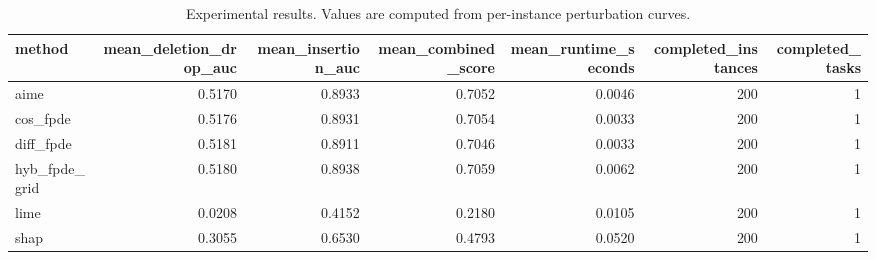 \begin{table}[t]
\caption{Experimental results. Values are computed from per-instance perturbation curves.}
\label{tab:main_results_computed}
\centering
\begin{tabular}{lrrrrrr}
\toprule
method & mean\_deletion\_drop\_auc & mean\_insertion\_auc & mean\_combined\_score & mean\_runtime\_seconds & completed\_instances & completed\_tasks \\
\midrule
aime & 0.5170 & 0.8933 & 0.7052 & 0.0046 & 200 & 1 \\
cos\_fpde & 0.5176 & 0.8931 & 0.7054 & 0.0033 & 200 & 1 \\
diff\_fpde & 0.5181 & 0.8911 & 0.7046 & 0.0033 & 200 & 1 \\
hyb\_fpde\_grid & 0.5180 & 0.8938 & 0.7059 & 0.0062 & 200 & 1 \\
lime & 0.0208 & 0.4152 & 0.2180 & 0.0105 & 200 & 1 \\
shap & 0.3055 & 0.6530 & 0.4793 & 0.0520 & 200 & 1 \\
\bottomrule
\end{tabular}

\end{table}
